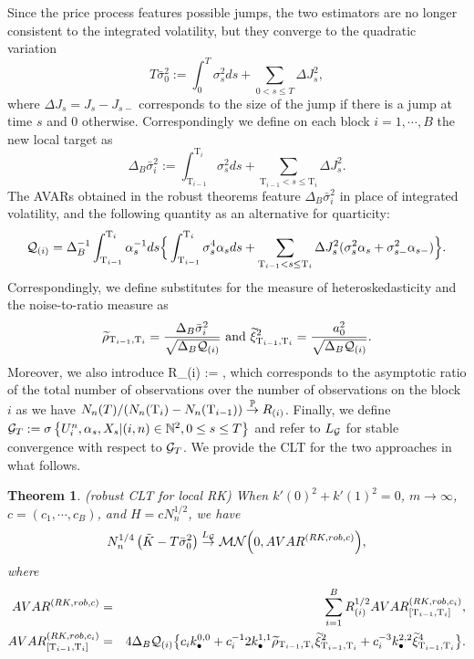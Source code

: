 \documentclass[11pt]{article}
\numberwithin{equation}{section}
\newcommand{\Tau}{\mathrm{T}}
\newcommand{\qtermlocal}[2]{\Delta_B^{-1}\int_{#1}^{#2}{\alpha_s^{-1}ds}\Big\{\int_{#1}^{#2}{\sigma_s^4 \alpha_sds} + \sum_{#1 < s \leq #2} \Delta J_s^2 (\sigma_s^2\alpha_s + \sigma_{s-}^2\alpha_{s-}) \Big\}}
\theoremstyle{plain}
\newtheorem{RKjumps}[RK0]{Theorem}
\theoremstyle{remark}
\begin{document}
\smallskip
Since the price process features possible jumps, the two estimators are no longer consistent to the integrated volatility, but they converge to the quadratic variation 
$$T\bar{\sigma}_0^2 :=\int_0^T{\sigma_s^2ds} + \sum_{0 < s \leq T}\Delta J_s^2,$$
where $\Delta J_s = J_s - J_{s-}$ corresponds to the size of the jump if there is a jump at time $s$ and 0 otherwise. Correspondingly we define on each block $i=1, \cdots, B$ the new local target as 
$$\Delta_B \bar{\sigma}_i^2 :=\int_{\Tau_{i-1}}^{\Tau_i} {\sigma_s^2ds} + \sum_{\Tau_{i-1} < s \leq \Tau_i}\Delta J_s^2.$$
The AVARs obtained in the robust theorems feature $\Delta_B \bar{\sigma}_i^2$ in place of integrated volatility, and the following quantity as an alternative for quarticity:
$$\calq_{(i)}  =  \qtermlocal{\Tau_{i-1}}{\Tau_i}.$$
Correspondingly, we define substitutes for the measure of heteroskedasticity and the noise-to-ratio measure as
\begin{eqnarray*}
\widetilde{\rho}_{\Tau_{i-1},\Tau_i}  =  \frac{\Delta_B \bar{\sigma}_i^2}{\sqrt{\Delta_B \calq_{(i)}}} \text{ and } \widetilde{\xi}_{\Tau_{i-1},\Tau_i}^2 = \frac{a_0^2}{\sqrt{ \Delta_B \calq_{(i)}}}.
\end{eqnarray*}
Moreover, we also introduce 
\bea 
R_{(i)} := \frac{\int_0^T{\alpha_s^{-1}ds}}{\int_{\Tau_{i-1}}^{\Tau_i} \alpha_s^{-1}ds},
\eea 
which corresponds to the asymptotic ratio of the total number of observations over the number of observations on the block $i$ as we have $N_n(T)/(N_n(\Tau_{i})-N_n(\Tau_{i-1})) \overset{\proba}{\rightarrow} R_{(i)}$. Finally, we define ${\cal G}_T := \sigma \left\{U_i^n, \alpha_s, X_s | (i,n) \in \mathbb{N}^2 ,  0 \leq s \leq T \right\}$  and refer to $L_{{\cal G}}$ for stable convergence with respect to ${\cal G}_T$. We provide the CLT for the two approaches in what follows.
\begin{RKjumps}
\label{RKthjumps} (robust CLT for local RK) When $k'(0)^2 + k'(1)^2 =0$, $m \rightarrow \infty$, $c = (c_1,\cdots,c_B)$, and $H = c N_n^{1/2}$, we have
\begin{eqnarray}
\label{RKth2Robust}
N_n^{1/4} \left( \tilde{K} -T\bar{\sigma}_0^2 \right) \overset{L_\mathcal{G}}{\rightarrow}  {\cal M}{\cal N} \Big(0, AVAR^{(RK,rob,c)}\Big),
\end{eqnarray}
where
\begin{eqnarray*}
AVAR^{(RK,rob,c)} &=& \sum_{i=1}^B R_{(i)}^{1/2}AVAR_{[\Tau_{i-1}, \Tau_i]}^{(RK,rob,c_i)}, \\
AVAR_{[\Tau_{i-1}, \Tau_i]}^{(RK,rob,c_i)} &=& 4 \Delta_B \calq_{(i)} \big\{ c_i k_{\bullet}^{0,0} + c_i^{-1} 2 k_{\bullet}^{1,1} \widetilde{\rho}_{\Tau_{i-1},\Tau_i} \widetilde{\xi}_{\Tau_{i-1},\Tau_i}^2 + c_i^{-3} k_{\bullet}^{2,2} \widetilde{\xi}_{\Tau_{i-1},\Tau_i}^4 \big\}.
\end{eqnarray*} 
\end{RKjumps}
\end{document}
